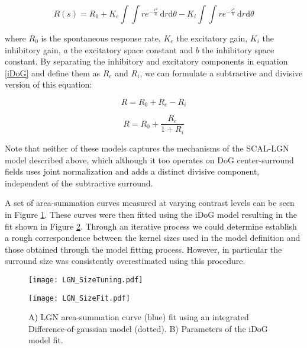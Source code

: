 \begin{equation}
R(s) = R_0 + K_e \int \int re^{-\frac{r^2}{a}} \,
\mathrm{d}r\mathrm{d}\theta - K_i \int\int re^{-\frac{r^2}{b}} \,
\mathrm{d}r\mathrm{d}\theta
\label{iDoG}
\end{equation}

\noindent where $R_0$ is the spontaneous response rate, $K_e$ the
excitatory gain, $K_i$ the inhibitory gain, $a$ the excitatory space
constant and $b$ the inhibitory space constant. By separating the
inhibitory and excitatory components in equation \ref{iDoG} and define
them as $R_e$ and $R_i$, we can formulate a subtractive and divisive
version of this equation:

\begin{equation}
R = R_0 + R_e - R_i
\label{DoGSubstractive}
\end{equation}

\begin{equation}
R = R_0 + \frac{R_e}{1+R_i}
\label{DoGDivisive}
\end{equation}

Note that neither of these models captures the mechanisms of the
SCAL-LGN model described above, which although it too operates on DoG
center-surround fields uses joint normalization and adds a distinct
divisive component, independent of the subtractive surround.

\citep{Results}
 
A set of area-summation curves measured at varying contrast levels can
be seen in Figure \ref{LGNSizeTuning}. These curves were then fitted
using the iDoG model resulting in the fit shown in Figure
\ref{LGNSizeFit}. Through an iterative process we could determine
establish a rough correspondence between the kernel sizes used in the
model definition and those obtained through the model fitting
process. However, in particular the surround size was consistently
overestimated using this procedure.

\begin{figure}
	\centering
        \texttt{[image: LGN\_SizeTuning.pdf]}
	\caption{}
	\label{LGNSizeTuning}
\end{figure}

\begin{figure}
	\centering
        \texttt{[image: LGN\_SizeFit.pdf]}
	\caption{A) LGN area-summation curve (blue) fit using an
          integrated Difference-of-gaussian model (dotted). B)
          Parameters of the iDoG model fit.}
	\label{LGNSizeFit}
\end{figure}

